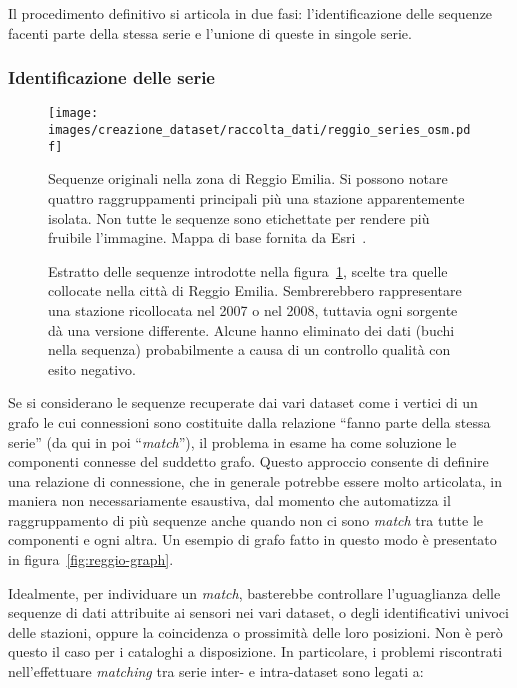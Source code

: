 Il procedimento definitivo si articola in due fasi: l'identificazione delle sequenze facenti parte della stessa serie e l'unione di queste in singole serie.

\subsubsection{Identificazione delle serie}
\begin{figure}[ht]
  \centering
  \texttt{[image: images/creazione\_dataset/raccolta\_dati/reggio\_series\_osm.pdf]}
  \caption{Sequenze originali nella zona di Reggio Emilia. Si possono notare quattro raggruppamenti principali più una stazione apparentemente isolata. Non tutte le sequenze sono etichettate per rendere più fruibile l'immagine. Mappa di base fornita da Esri~\autocite{esriWorldTopographicMap2013}.}\label{fig:reggio-osm}
\end{figure}
\begin{figure}[ht]
  \centering
  
  \caption{Estratto delle sequenze introdotte nella figura~\ref{fig:reggio-osm}, scelte tra quelle collocate nella città di Reggio Emilia. Sembrerebbero rappresentare una stazione ricollocata nel 2007 o nel 2008, tuttavia ogni sorgente dà una versione differente. Alcune hanno eliminato dei dati (buchi nella sequenza) probabilmente a causa di un controllo qualità con esito negativo.}\label{fig:reggio-plot}
\end{figure}
Se si considerano le sequenze recuperate dai vari dataset come i vertici di un grafo le cui connessioni sono costituite dalla relazione ``fanno parte della stessa serie'' (da qui in poi ``\emph{match}''), il problema in esame ha come soluzione le componenti connesse del suddetto grafo. Questo approccio consente di definire una relazione di connessione, che in generale potrebbe essere molto articolata, in maniera non necessariamente esaustiva, dal momento che automatizza il raggruppamento di più sequenze anche quando non ci sono \emph{match} tra tutte le componenti e ogni altra. Un esempio di grafo fatto in questo modo è presentato in figura~\ref{fig:reggio-graph}.

Idealmente, per individuare un \emph{match}, basterebbe controllare l'uguaglianza delle sequenze di dati attribuite ai sensori nei vari dataset, o degli identificativi univoci delle stazioni, oppure la coincidenza o prossimità delle loro posizioni. Non è però questo il caso per i cataloghi a disposizione. In particolare, i problemi riscontrati nell'effettuare \emph{matching} tra serie inter- e intra-dataset sono legati a:

